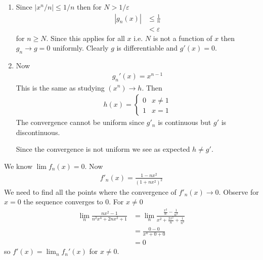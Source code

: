 \begin{enumerate}[label=(\alph*)]
    \item 
    Since $|x^n/n|\leq 1/n$ then for $N>1/\varepsilon$
    \begin{align*}
        |g_n(x)| &\leq \frac{1}{n} \\
                &< \varepsilon
    \end{align*}
    for $n\geq N$. Since this applies for all $x$ i.e. 
    $N$ is not a function of $x$ then 
    $g_n \rightarrow g = 0$ uniformly. Clearly $g$ is
    differentiable and $g'(x)=0$.

    \item
    Now 
    \begin{align*}
        g_n'(x) = x^{n-1}
    \end{align*}
    This is the same as studying $(x^n)\rightarrow h$. Then 
    \begin{align*}
        h(x) = \begin{cases}
            0 & x \neq 1 \\
            1 & x = 1
        \end{cases}
    \end{align*}
    The convergence cannot be uniform since $g'_n$ is continuous 
    but $g'$ is discontinuous.
    
    Since the convergence is not uniform we see as 
    expected $h\neq g'$.
\end{enumerate}

We know $\lim f_n(x)=0$.
Now 
\begin{align*}
    f'_n(x) = \frac{1-nx^2}{(1+nx^2)^2}
\end{align*}
We need to find all the points where the convergence of $f'_n(x)\rightarrow 0$.
Observe for $x=0$ the sequence converges to $0$. For $x\neq 0$
\begin{align*}
    \lim_n \frac{nx^2-1}{n^2 x^4+2nx^2+1} &= \lim_n \frac{\frac{x^2}{n}-\frac{1}{n^2}}{x^2+\frac{2x^2}{n}+\frac{1}{n^2}} \\
    &= \frac{0 - 0}{x^4+0+0} \\
    &= 0
\end{align*}
so $f'(x)=\lim_n f_n'(x)$ for $x\neq 0$.

